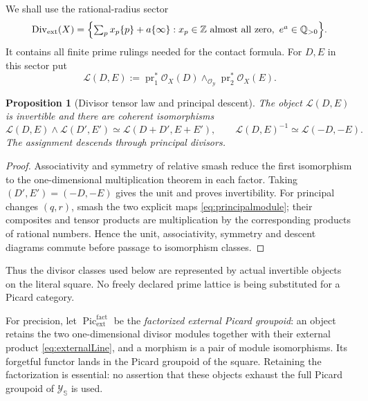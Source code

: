 \documentclass[11pt]{amsart}
\newtheorem{proposition}[theorem]{Proposition}
\theoremstyle{definition}
\theoremstyle{remark}
\newcommand{\Z}{\mathbb Z}
\newcommand{\Q}{\mathbb Q}
\newcommand{\Div}{\operatorname{Div}}
\newcommand{\Pic}{\operatorname{Pic}}
\begin{document}
We shall use the rational-radius sector
\[
 \Div_{\mathrm{ext}}(X)=\Bigl\{\textstyle\sum_p x_p\{p\}+a\{\infty\}:
 x_p\in\Z\text{ almost all zero},\ e^{a}\in\Q_{>0}\Bigr\}.
\]  It contains all finite prime rulings needed for
the contact formula.  For $D,E$ in this sector put
\begin{equation}\label{eq:externalLine}
 \mathcal L(D,E):=\operatorname{pr}_1^*\mathcal O_X(D)
 \wedge_{\mathcal O_{\mathscr Y}}
 \operatorname{pr}_2^*\mathcal O_X(E).
\end{equation}

\begin{proposition}[Divisor tensor law and principal descent]
\label{prop:divisorlines}
The object $\mathcal L(D,E)$ is invertible and there are coherent
isomorphisms
\begin{equation}\label{eq:lineTensorLaw}
 \mathcal L(D,E)\wedge\mathcal L(D',E')
 \simeq\mathcal L(D+D',E+E'),
 \qquad \mathcal L(D,E)^{-1}\simeq\mathcal L(-D,-E).
\end{equation}
The assignment descends through principal divisors.
\end{proposition}

\begin{proof}
Associativity and symmetry of relative smash reduce the first isomorphism
to the one-dimensional multiplication theorem in each factor.  Taking
$(D',E')=(-D,-E)$ gives the unit and proves invertibility.  For principal
changes $(q,r)$, smash the two explicit maps \eqref{eq:principalmodule};
their composites and tensor products are multiplication by the corresponding
products of rational numbers.  Hence the unit, associativity, symmetry and
descent diagrams commute before passage to isomorphism classes.
\end{proof}

Thus the divisor classes used below are represented by actual invertible
objects on the literal square.  No freely declared prime lattice is being
substituted for a Picard category.

For precision, let $\Pic_{\mathrm{ext}}^{\mathrm{fact}}$ be the
\emph{factorized external Picard groupoid}: an object retains the two
one-dimensional divisor modules together with their external product
\eqref{eq:externalLine}, and a morphism is a pair of module isomorphisms.
Its forgetful functor lands in the Picard groupoid of the square.  Retaining
the factorization is essential: no assertion that these objects exhaust the
full Picard groupoid of $\mathscr Y_{\mathbb S}$ is used.
\end{document}
